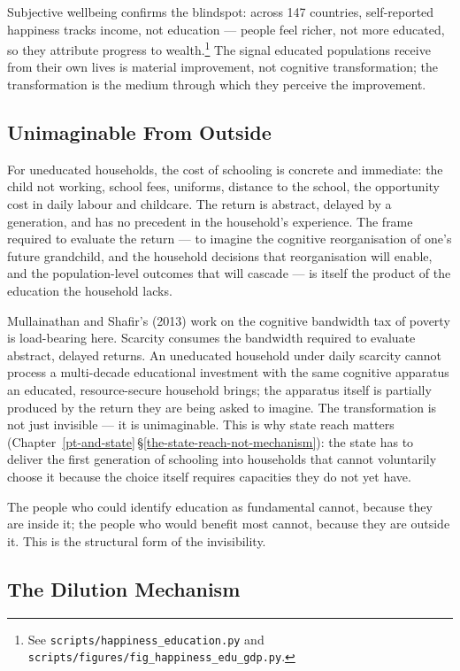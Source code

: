 \documentclass[12pt,letterpaper]{article}
\begin{document}
Subjective wellbeing confirms the blindspot: across 147 countries,
self-reported happiness tracks income, not education --- people feel
richer, not more educated, so they attribute progress to
wealth.\footnote{See \nolinkurl{scripts/happiness_education.py} and
\nolinkurl{scripts/figures/fig_happiness_edu_gdp.py}.} The signal
educated populations receive from their own lives is material
improvement, not cognitive transformation; the transformation is the
medium through which they perceive the improvement.

\subsection{Unimaginable From Outside}\label{unimaginable-from-outside}

For uneducated households, the cost of schooling is concrete and
immediate: the child not working, school fees, uniforms, distance to
the school, the opportunity cost in daily labour and childcare. The
return is abstract, delayed by a generation, and has no precedent in
the household's experience. The frame required to evaluate the
return --- to imagine the cognitive reorganisation of one's future
grandchild, and the household decisions that reorganisation will
enable, and the population-level outcomes that will cascade --- is
itself the product of the education the household lacks.

Mullainathan and Shafir's (2013) work on the cognitive bandwidth tax
of poverty is load-bearing here. Scarcity consumes the bandwidth
required to evaluate abstract, delayed returns. An uneducated
household under daily scarcity cannot process a multi-decade
educational investment with the same cognitive apparatus an educated,
resource-secure household brings; the apparatus itself is partially
produced by the return they are being asked to imagine. The
transformation is not just invisible --- it is unimaginable. This is
why state reach matters
(Chapter~\ref{pt-and-state}\,\S\ref{the-state-reach-not-mechanism}):
the state has to deliver the first generation of schooling into
households that cannot voluntarily choose it because the choice
itself requires capacities they do not yet have.

The people who could identify education as fundamental cannot,
because they are inside it; the people who would benefit most cannot,
because they are outside it. This is the structural form of the
invisibility.

\subsection{The Dilution Mechanism}\label{the-dilution-mechanism}
\end{document}
